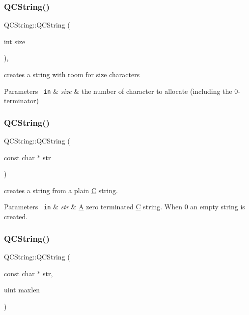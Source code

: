 \subsubsection{\texorpdfstring{QCString()}{QCString()}\hspace{0.1cm}{\footnotesize\ttfamily [3/5]}}
{\footnotesize\ttfamily Q\+C\+String\+::\+Q\+C\+String (\begin{DoxyParamCaption}\item[{int}]{size }\end{DoxyParamCaption})\hspace{0.3cm}{\ttfamily [inline]}, {\ttfamily [explicit]}}

creates a string with room for size characters 
\begin{DoxyParams}[1]{Parameters}
\mbox{\texttt{ in}}  & {\em size} & the number of character to allocate (including the 0-\/terminator) \\
\hline
\end{DoxyParams}
\mbox{\label{class_q_c_string_a2286f03edc20befca29cd2b2f57de1f6}} 
\subsubsection{\texorpdfstring{QCString()}{QCString()}\hspace{0.1cm}{\footnotesize\ttfamily [4/5]}}
{\footnotesize\ttfamily Q\+C\+String\+::\+Q\+C\+String (\begin{DoxyParamCaption}\item[{const char $\ast$}]{str }\end{DoxyParamCaption})\hspace{0.3cm}{\ttfamily [inline]}}

creates a string from a plain \mbox{\hyperlink{class_c}{C}} string. 
\begin{DoxyParams}[1]{Parameters}
\mbox{\texttt{ in}}  & {\em str} & \mbox{\hyperlink{class_a}{A}} zero terminated \mbox{\hyperlink{class_c}{C}} string. When 0 an empty string is created. \\
\hline
\end{DoxyParams}
\mbox{\label{class_q_c_string_a0a7f38230a080e7583bf2747d587cc7d}} 
\subsubsection{\texorpdfstring{QCString()}{QCString()}\hspace{0.1cm}{\footnotesize\ttfamily [5/5]}}
{\footnotesize\ttfamily Q\+C\+String\+::\+Q\+C\+String (\begin{DoxyParamCaption}\item[{const char $\ast$}]{str,  }\item[{uint}]{maxlen }\end{DoxyParamCaption})\hspace{0.3cm}{\ttfamily [inline]}}

